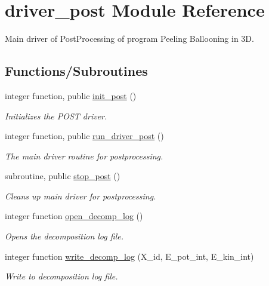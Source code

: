 \hypertarget{namespacedriver__post}{}\section{driver\+\_\+post Module Reference}
\label{namespacedriver__post}


Main driver of Post\+Processing of program Peeling Ballooning in 3D.  


\subsection*{Functions/\+Subroutines}
\begin{DoxyCompactItemize}
\item 
integer function, public \hyperlink{namespacedriver__post_af527706d4e696d4e507443d2f74194ef}{init\+\_\+post} ()
\begin{DoxyCompactList}\small\item\em Initializes the P\+O\+ST driver. \end{DoxyCompactList}\item 
integer function, public \hyperlink{namespacedriver__post_a33b3c6f9018a0ddc92dce77394b8ab37}{run\+\_\+driver\+\_\+post} ()
\begin{DoxyCompactList}\small\item\em The main driver routine for postprocessing. \end{DoxyCompactList}\item 
subroutine, public \hyperlink{namespacedriver__post_a71f9fb1935222111e1c7cfc15c5d0269}{stop\+\_\+post} ()
\begin{DoxyCompactList}\small\item\em Cleans up main driver for postprocessing. \end{DoxyCompactList}\item 
integer function \hyperlink{namespacedriver__post_a5d76f87f131e21b4d74fd5f4a7bbbd6b}{open\+\_\+decomp\+\_\+log} ()
\begin{DoxyCompactList}\small\item\em Opens the decomposition log file. \end{DoxyCompactList}\item 
integer function \hyperlink{namespacedriver__post_a4981c6c0e63b862c92ba240f43e22e77}{write\+\_\+decomp\+\_\+log} (X\+\_\+id, E\+\_\+pot\+\_\+int, E\+\_\+kin\+\_\+int)
\begin{DoxyCompactList}\small\item\em Write to decomposition log file. \end{DoxyCompactList}\item 

\end{DoxyCompactItemize}
